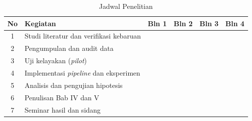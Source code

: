 \begin{table}[htbp]
  \caption{Jadwal Penelitian}
  \label{tab:jadwal}
  \centering
  \begingroup
  \begin{tabular}{|c|p{}|c|c|c|c|}
    \hline
    \textbf{No} & \textbf{Kegiatan} & \textbf{Bln 1} & \textbf{Bln 2} &
    \textbf{Bln 3} & \textbf{Bln 4} \\
    \hline
    1 & Studi literatur dan verifikasi kebaruan & & & & \\
    \hline
    2 & Pengumpulan dan audit data & & & & \\
    \hline
    3 & Uji kelayakan (\textit{pilot}) & & & & \\
    \hline
    4 & Implementasi \textit{pipeline} dan eksperimen & & & & \\
    \hline
    5 & Analisis dan pengujian hipotesis & & & & \\
    \hline
    6 & Penulisan Bab IV dan V & & & & \\
    \hline
    7 & Seminar hasil dan sidang & & & & \\
    \hline
  \end{tabular}
  \endgroup
\end{table}
